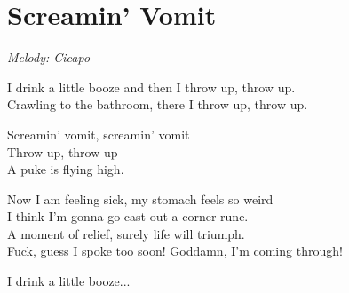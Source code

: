 \section{Screamin' Vomit}

\textit{Melody: Cicapo}

I drink a little booze and then I throw up, throw up.\\
Crawling to the bathroom, there I throw up, throw up.

Screamin' vomit, screamin' vomit\\
Throw up, throw up\\
A puke is flying high.

Now I am feeling sick, my stomach feels so weird\\
I think I'm gonna go cast out a corner rune.\\
A moment of relief, surely life will triumph.\\
Fuck, guess I spoke too soon! Goddamn, I'm coming through!

I drink a little booze...